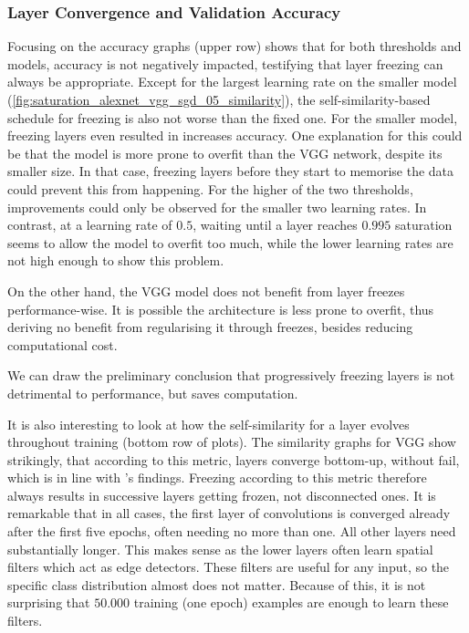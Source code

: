 \subsubsection{Layer Convergence and Validation Accuracy}

Focusing on the accuracy graphs (upper row) shows that for both thresholds and
models, accuracy is not negatively impacted, testifying that layer freezing can
always be appropriate. Except for the largest learning rate on the smaller model
(\cref{fig:saturation_alexnet_vgg_sgd_05_similarity}), the self-similarity-based
schedule for freezing is also not worse than the fixed one. For the smaller
model, freezing layers even resulted in increases accuracy. One explanation for
this could be that the model is more prone to overfit than the VGG network,
despite its smaller size. In that case, freezing layers before they start to
memorise the data could prevent this from happening.  For the higher of the two
thresholds, improvements could only be observed for the smaller two learning
rates. In contrast, at a learning rate of $0.5$, waiting until a layer reaches
$0.995$ saturation seems to allow the model to overfit too much, while the lower
learning rates are not high enough to show this problem.

On the other hand, the VGG model does not benefit from layer freezes
performance-wise. It is possible the architecture is less prone to overfit, thus
deriving no benefit from regularising it through freezes, besides reducing
computational cost.

We can draw the preliminary conclusion that progressively freezing layers is not
detrimental to performance, but saves computation.

It is also interesting to look at how the self-similarity for a layer evolves
throughout training (bottom row of plots). The similarity graphs for VGG show
strikingly, that according to this metric, layers converge bottom-up, without
fail, which is in line with \citet{raghu2017svcca}'s findings. Freezing
according to this metric therefore always results in successive layers getting
frozen, not disconnected ones. It is remarkable that in all cases, the first
layer of convolutions is converged already after the first five epochs, often
needing no more than one. All other layers need substantially longer. This makes
sense as the lower layers often learn spatial filters which act as edge
detectors. These filters are useful for any input, so the specific class
distribution almost does not matter. Because of this, it is not surprising that
$50.000$ training (one epoch) examples are enough to learn these filters.

